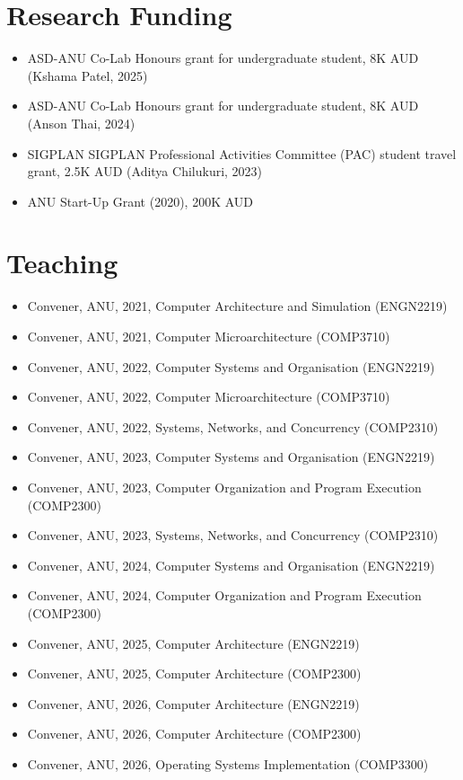 \documentclass[singlecolumn,singlespace,11pt]{article}
\begin{document}
\section*{Research Funding}
\begin{itemize}
\item ASD-ANU Co-Lab Honours grant for undergraduate student, 8K AUD (Kshama Patel, 2025) 
\item ASD-ANU Co-Lab Honours grant for undergraduate student, 8K AUD (Anson Thai, 2024)
\item SIGPLAN SIGPLAN Professional Activities Committee (PAC) student travel grant, 2.5K AUD (Aditya Chilukuri, 2023)
\item ANU Start-Up Grant (2020), 200K AUD
\end{itemize}

\section*{Teaching}
\begin{itemize}
\item Convener, ANU, 2021, Computer Architecture and Simulation (ENGN2219)
\item Convener, ANU, 2021, Computer Microarchitecture (COMP3710) 
\item Convener, ANU, 2022, Computer Systems and Organisation (ENGN2219)
\item Convener, ANU, 2022, Computer Microarchitecture (COMP3710) 
\item Convener, ANU, 2022, Systems, Networks, and Concurrency (COMP2310) 
\item Convener, ANU, 2023, Computer Systems and Organisation (ENGN2219) 
\item Convener, ANU, 2023, Computer Organization and Program Execution (COMP2300) 
\item Convener, ANU, 2023, Systems, Networks, and Concurrency (COMP2310) 
\item Convener, ANU, 2024, Computer Systems and Organisation (ENGN2219) 
\item Convener, ANU, 2024, Computer Organization and Program Execution (COMP2300)
\item Convener, ANU, 2025, Computer Architecture (ENGN2219) 
\item Convener, ANU, 2025, Computer Architecture (COMP2300)
\item Convener, ANU, 2026, Computer Architecture (ENGN2219) 
\item Convener, ANU, 2026, Computer Architecture (COMP2300)
\item Convener, ANU, 2026, Operating Systems Implementation (COMP3300)
\end{itemize}
\end{document}
